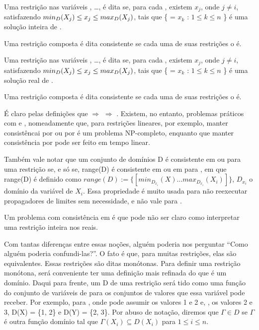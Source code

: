 \begin{definition}
  Uma restrição  nas variáveis , \dots,  é dita
  se, para cada , existem  $x_j$, onde $j \neq i$,
  satisfazendo $min_D(\textit{$X_j$}) \leq x_j \leq max_D(\textit{$X_j$})$,
  tais que \{ = $x_k$ : $1 \leq k \leq n$ \}
  é uma solução inteira de .

  Uma restrição composta é dita \boundz{} consistente se cada uma de suas restrições o é.
\end{definition}

\begin{definition}
  Uma restrição  nas variáveis , \dots,  é dita
  se, para cada , existem  $x_j$, onde $j \neq i$,
  satisfazendo $min_D(\textit{$X_j$}) \leq x_j \leq max_D(\textit{$X_j$})$,
  tais que \{ = $x_k$ : $1 \leq k \leq n$ \}
  é uma solução real de .

  Uma restrição composta é dita \boundr{} consistente se cada uma de suas restrições o é.
\end{definition}

É claro pelas definições que \boundd{} $\Rightarrow$ \boundz{} $\Rightarrow$ \boundr. Existem, no
entanto, problemas práticos com \boundd{} e \boundz, nomeadamente que, para restrições lineares, por
exemplo, manter consistêncai por \boundd{} ou por \boundz{} é um problema NP-completo, enquanto que
manter consistência por \boundr{} pode ser feito em tempo linear.

Também vale notar que um conjunto de domínios D é consistente em \boundz{} ou \boundr{} para uma
restrição  se, e só se, range(D) é consistente em \boundz{} ou em \boundr{} para
, em que range(D) é definido como $range(D) := \{[min_D_x_i(X) \ldots  max_D_x_i(X_i)]\}$, $D_x_i$ o domínio da
variável de  $X_i$. Essa propriedade é muito usada para não reexecutar propagadores
de limites sem necessidade, e não vale para \boundd{}.

Um problema com consistência em \boundr{} é que pode não ser claro como interpretar uma restrição
inteira nos reais.

Com tantas diferenças entre essas noções, alguém poderia nos perguntar ``Como alguém poderia
confundi-las?''. O fato é que, para muitas restrições, elas são equivalentes. Essas restrições são
ditas monótonas. Para definir uma restrição monótona, será conveniente ter uma definição mais
refinada do que é um domínio. Daqui para frente, um  D de uma restrição
 será tido como uma função do conjunto de variáveis de  para os conjuntos de
valores que essa variável pode receber. Por exemplo, para , onde 
pode assumir os valores 1 e 2 e, , os valores 2 e 3, D(X) = \{1, 2\} e D(Y) = \{2, 3\}. Por
abuso de notação, diremos que $\Gamma \in D$ se $\Gamma$ é outra função domínio tal que $\Gamma(X_i)
\subseteq D(X_i)$ para $1 \leq i \leq n$.

